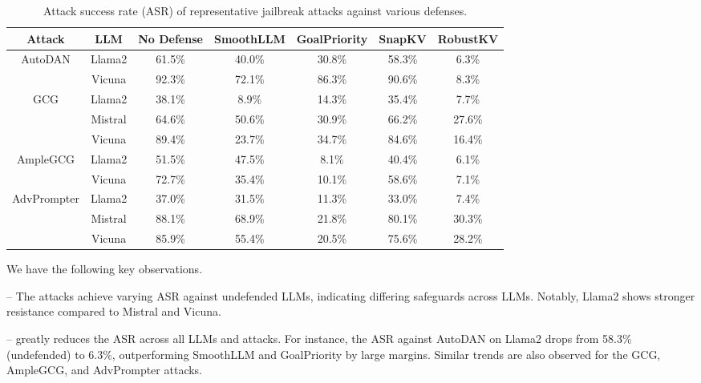 \begin{table}[!ht]\footnotesize
\renewcommand{\arraystretch}{1.1}
\centering
\begin{tabular}{c|c|c|c|c|c|c }
Attack &  LLM  & No Defense & SmoothLLM & GoalPriority & SnapKV & RobustKV\\

\hline 
\multirow{2}{*}{AutoDAN} & Llama2 & 61.5\% & 40.0\% & 30.8\% & 58.3\% & \cellcolor{Red}6.3\% \\ 
& Vicuna & 92.3\% & 72.1\% & 86.3\% & 90.6\% & \cellcolor{Red}8.3\%\\

\hline
\multirow{3}{*}{GCG} & Llama2 & 38.1\% & 8.9\% & 14.3\% & 35.4\% & \cellcolor{Red}7.7\%\\ 
& Mistral & 64.6\% & 50.6\% & 30.9\% & 66.2\% & \cellcolor{Red}27.6\%\\
& Vicuna & 89.4\% & 23.7\%  & 34.7\% & 84.6\% & \cellcolor{Red}16.4\% \\

\hline 
\multirow{2}{*}{AmpleGCG} & Llama2 & 51.5\% & 47.5\% & 8.1\% & 40.4\% & \cellcolor{Red}6.1\% \\ 
& Vicuna & 72.7\% & 35.4\% & 10.1\% & 58.6\% & \cellcolor{Red}7.1\%\\

\hline
\multirow{3}{*}{AdvPrompter}  & Llama2 & 37.0\% & 31.5\% & 11.3\% & 33.0\% & \cellcolor{Red}7.4\%\\ 
& Mistral & 88.1\% & 68.9\% & \cellcolor{Red}21.8\% & 80.1\% & 30.3\%\\
& Vicuna & 85.9\% & 55.4\% & \cellcolor{Red}20.5\% & 75.6\% & 28.2\%\\


\end{tabular}
\caption{Attack success rate (ASR) of representative jailbreak attacks against various defenses.\label{tab:1}}
\end{table}


We have the following key observations. 

-- The attacks achieve varying ASR against undefended LLMs, indicating differing safeguards across LLMs. Notably, Llama2 shows stronger resistance compared to Mistral and Vicuna. 

-- \rkv greatly reduces the ASR across all LLMs and attacks. For instance, the ASR against AutoDAN on Llama2 drops from 58.3\% (undefended) to 6.3\%, outperforming SmoothLLM and GoalPriority by large margins. Similar trends are also observed for the GCG, AmpleGCG, and AdvPrompter attacks. %

